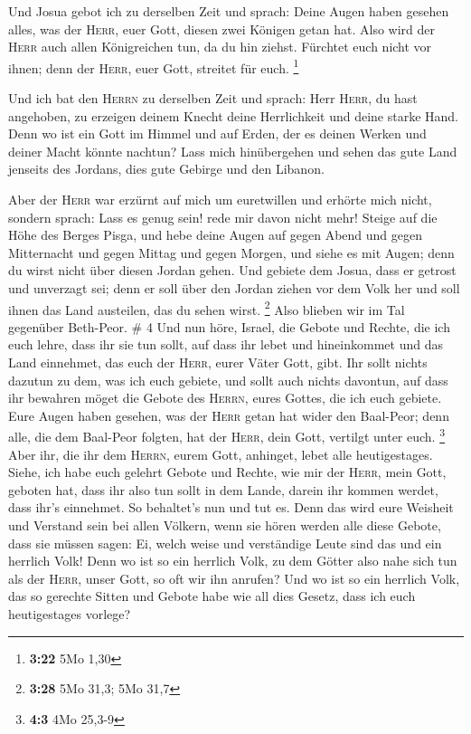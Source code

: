  Und Josua gebot ich zu derselben Zeit und sprach: Deine
Augen haben gesehen alles, was der \textsc{Herr}, euer Gott, diesen zwei
Königen getan hat. Also wird der \textsc{Herr} auch allen Königreichen
tun, da du hin ziehst.  Fürchtet euch nicht vor ihnen;
denn der \textsc{Herr}, euer Gott, streitet für euch. \footnote{\textbf{3:22}
  5Mo 1,30}

 Und ich bat den \textsc{Herrn} zu derselben Zeit und
sprach:  Herr \textsc{Herr}, du hast angehoben, zu
erzeigen deinem Knecht deine Herrlichkeit und deine starke Hand. Denn wo
ist ein Gott im Himmel und auf Erden, der es deinen Werken und deiner
Macht könnte nachtun?  Lass mich hinübergehen und sehen
das gute Land jenseits des Jordans, dies gute Gebirge und den Libanon.

 Aber der \textsc{Herr} war erzürnt auf mich um
euretwillen und erhörte mich nicht, sondern sprach: Lass es genug sein!
rede mir davon nicht mehr!  Steige auf die Höhe des
Berges Pisga, und hebe deine Augen auf gegen Abend und gegen Mitternacht
und gegen Mittag und gegen Morgen, und siehe es mit Augen; denn du wirst
nicht über diesen Jordan gehen.  Und gebiete dem Josua,
dass er getrost und unverzagt sei; denn er soll über den Jordan ziehen
vor dem Volk her und soll ihnen das Land austeilen, das du sehen wirst.
\footnote{\textbf{3:28} 5Mo 31,3; 5Mo 31,7}  Also blieben
wir im Tal gegenüber Beth-Peor. \# 4  Und nun höre,
Israel, die Gebote und Rechte, die ich euch lehre, dass ihr sie tun
sollt, auf dass ihr lebet und hineinkommet und das Land einnehmet, das
euch der \textsc{Herr}, eurer Väter Gott, gibt.  Ihr sollt
nichts dazutun zu dem, was ich euch gebiete, und sollt auch nichts
davontun, auf dass ihr bewahren möget die Gebote des \textsc{Herrn},
eures Gottes, die ich euch gebiete.  Eure Augen haben
gesehen, was der \textsc{Herr} getan hat wider den Baal-Peor; denn alle,
die dem Baal-Peor folgten, hat der \textsc{Herr}, dein Gott, vertilgt
unter euch. \footnote{\textbf{4:3} 4Mo 25,3-9}  Aber ihr,
die ihr dem \textsc{Herrn}, eurem Gott, anhinget, lebet alle
heutigestages.  Siehe, ich habe euch gelehrt Gebote und
Rechte, wie mir der \textsc{Herr}, mein Gott, geboten hat, dass ihr also
tun sollt in dem Lande, darein ihr kommen werdet, dass ihr's einnehmet.
 So behaltet's nun und tut es. Denn das wird eure Weisheit
und Verstand sein bei allen Völkern, wenn sie hören werden alle diese
Gebote, dass sie müssen sagen: Ei, welch weise und verständige Leute
sind das und ein herrlich Volk!  Denn wo ist so ein
herrlich Volk, zu dem Götter also nahe sich tun als der \textsc{Herr},
unser Gott, so oft wir ihn anrufen?  Und wo ist so ein
herrlich Volk, das so gerechte Sitten und Gebote habe wie all dies
Gesetz, dass ich euch heutigestages vorlege?

